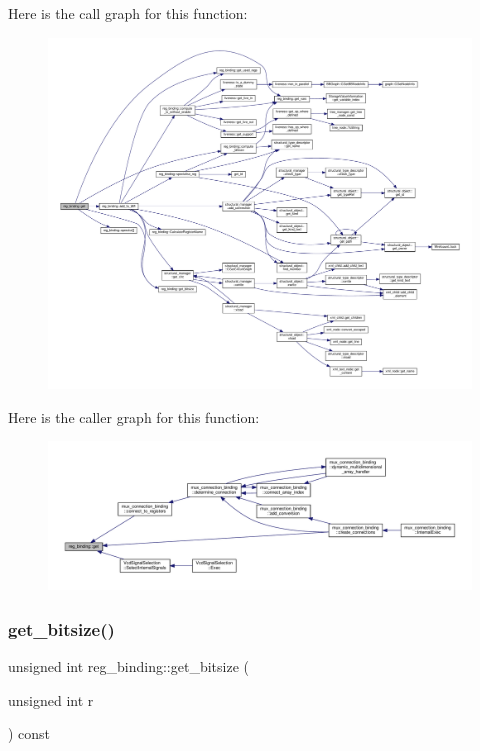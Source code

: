 Here is the call graph for this function\+:
\nopagebreak
\begin{figure}[H]
\begin{center}
\leavevmode
\includegraphics[width=350pt]{da/d7c/classreg__binding_ad041ee9fb9f1951b5f7a14723aa36983_cgraph}
\end{center}
\end{figure}
Here is the caller graph for this function\+:
\nopagebreak
\begin{figure}[H]
\begin{center}
\leavevmode
\includegraphics[width=350pt]{da/d7c/classreg__binding_ad041ee9fb9f1951b5f7a14723aa36983_icgraph}
\end{center}
\end{figure}
\mbox{\label{classreg__binding_a0cabf46fc41f3e673c810459e728b41c}} 
\subsubsection{\texorpdfstring{get\+\_\+bitsize()}{get\_bitsize()}}
{\footnotesize\ttfamily unsigned int reg\+\_\+binding\+::get\+\_\+bitsize (\begin{DoxyParamCaption}\item[{unsigned int}]{r }\end{DoxyParamCaption}) const}



